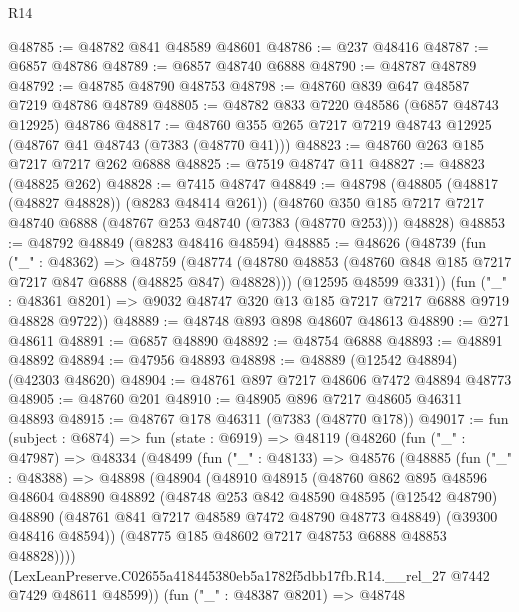 \begin{lexlean}{R14}
\begin{coremodule}
@48785 := @48782 @841 @48589 @48601
@48786 := @237 @48416
@48787 := @6857 @48786
@48789 := @6857 @48740 @6888
@48790 := @48787 @48789
@48792 := @48785 @48790 @48753
@48798 := @48760 @839 @647 @48587 @7219 @48786 @48789
@48805 := @48782 @833 @7220 @48586 (@6857 @48743 @12925) @48786
@48817 := @48760 @355 @265 @7217 @7219 @48743 @12925 (@48767 @41 @48743 (@7383 (@48770 @41)))
@48823 := @48760 @263 @185 @7217 @7217 @262 @6888
@48825 := @7519 @48747 @11
@48827 := @48823 (@48825 @262)
@48828 := @7415 @48747
@48849 := @48798
    (@48805 (@48817 (@48827 @48828)) (@8283 @48414 @261))
    (@48760 @350 @185 @7217 @7217 @48740 @6888 (@48767 @253 @48740 (@7383 (@48770 @253))) @48828)
@48853 := @48792 @48849 (@8283 @48416 @48594)
@48885 := @48626
    (@48739
      (fun ("_" : @48362) =>
      @48759
        (@48774 (@48780 @48853 (@48760 @848 @185 @7217 @7217 @847 @6888 (@48825 @847) @48828)))
        (@12595 @48599 @331))
      (fun ("_" : @48361 @8201) => @9032 @48747 @320 @13 @185 @7217 @7217 @6888 @9719 @48828 @9722))
@48889 := @48748 @893 @898 @48607 @48613
@48890 := @271 @48611
@48891 := @6857 @48890
@48892 := @48754 @6888
@48893 := @48891 @48892
@48894 := @47956 @48893
@48898 := @48889 (@12542 @48894) (@42303 @48620)
@48904 := @48761 @897 @7217 @48606 @7472 @48894 @48773
@48905 := @48760 @201
@48910 := @48905 @896 @7217 @48605 @46311 @48893
@48915 := @48767 @178 @46311 (@7383 (@48770 @178))
@49017 := fun (subject : @6874) =>
  fun (state : @6919) =>
  @48119
    (@48260
      (fun ("_" : @47987) =>
      @48334
        (@48499
          (fun ("_" : @48133) =>
          @48576
            (@48885
              (fun ("_" : @48388) =>
              @48898
                (@48904
                  (@48910
                    @48915
                    (@48760
                      @862
                      @895
                      @48596
                      @48604
                      @48890
                      @48892
                      (@48748
                        @253
                        @842
                        @48590
                        @48595
                        (@12542 @48790)
                        @48890
                        (@48761 @841 @7217 @48589 @7472 @48790 @48773 @48849)
                        (@39300 @48416 @48594))
                      (@48775 @185 @48602 @7217 @48753 @6888 @48853 @48828))))
                (LexLeanPreserve.C02655a418445380eb5a1782f5dbb17fb.R14.__rel_27
                  @7442
                  @7429
                  @48611
                  @48599))
              (fun ("_" : @48387 @8201) =>
              @48748

\end{coremodule}
\end{lexlean}
